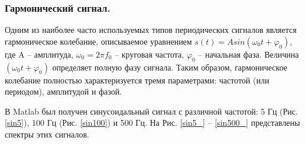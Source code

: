 \documentclass[a4paper,14pt]{extarticle}
\begin{document}
\subsubsection{Гармонический сигнал.}
Одним из наиболее часто используемых типов периодических сигналов является гармоническое колебание, описываемое уравнением $s (t) = A sin (\omega_0 t + \varphi_0 )$, где A – амплитуда, $\omega_0 = 2 \pi f_0$ – круговая частота, $\varphi_0$ – начальная фаза. Величина $(\omega_0 t + \varphi_0)$ определяет полную фазу сигнала. Таким образом, гармоническое колебание полностью характеризуется тремя параметрами: частотой (или периодом), амплитудой и фазой.

В Matlab был получен синусоидальный сигнал с различной частотой: 5 Гц (Рис. \ref{sin5}), 100 Гц (Рис. \ref{sin100}) и 500 Гц. На Рис. \ref{sin5_} -- \ref{sin500_} представлены спектры этих сигналов.
\end{document}
